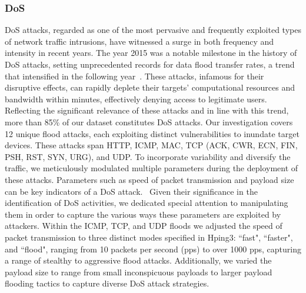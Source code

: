 \documentclass[lettersize,journal]{IEEEtran}
\begin{document}
\subsubsection{DoS}\label{sec:dos}
\ac{DoS} attacks, regarded as one of the most pervasive and frequently exploited types of network traffic intrusions, have witnessed a surge in both frequency and intensity in recent years. The year 2015 was a notable milestone in the history of \ac{DoS} attacks, setting unprecedented records for data flood transfer rates, a trend that intensified in the following year~\cite{macia2010defense}. These attacks, infamous for their disruptive effects, can rapidly deplete their targets' computational resources and bandwidth within minutes, effectively denying access to legitimate users. Reflecting the significant relevance of these attacks and in line with this trend, more than 85\% of our dataset constitutes \ac{DoS} attacks. Our investigation covers 12 unique flood attacks, each exploiting distinct vulnerabilities to inundate target devices. These attacks span HTTP, \ac{ICMP}, MAC, \ac{TCP} (ACK, CWR, ECN, FIN, PSH, RST, SYN, URG), and UDP. To incorporate variability and diversify the traffic, we meticulously modulated multiple parameters during the deployment of these attacks. Parameters such as speed of packet transmission and payload size can be key indicators of a \ac{DoS} attack.~\cite{alkasassbeh2016DDoS} Given their significance in the identification of \ac{DoS} activities, we dedicated special attention to manipulating them in order to capture the various ways these parameters are exploited by attackers. Within the \ac{ICMP}, \ac{TCP}, and \ac{UDP} floods we adjusted the speed of packet transmission to three distinct modes specified in Hping3: ``fast", ``faster", and ``flood", ranging from 10 packets per second (pps) to over 1000 pps, capturing a range of stealthy to aggressive flood attacks. Additionally, we varied the payload size to range from small inconspicuous payloads to larger payload flooding tactics to capture diverse DoS attack strategies.
\end{document}
